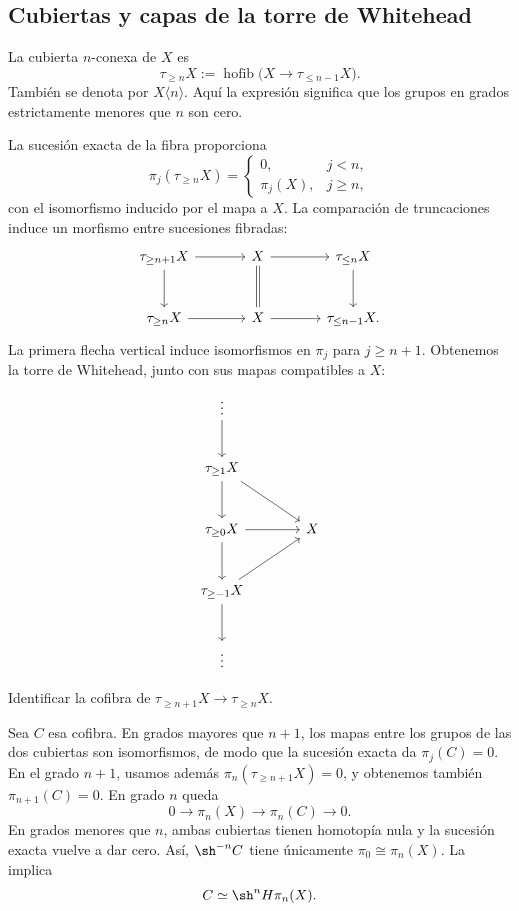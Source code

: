 \subsection{Cubiertas y capas de la torre de Whitehead}
\begin{defi}
La cubierta $n$-conexa de $X$ es
\[
\tau_{\geq n}X:=\operatorname{hofib}\bigl(X\longrightarrow\tau_{\leq n-1}X\bigr).
\]
También se denota por $X\langle n\rangle$. Aquí la expresión significa que los grupos en grados estrictamente menores que $n$ son cero.
\end{defi}
La sucesión exacta de la fibra proporciona
\[
\pi_j(\tau_{\geq n}X)=
\begin{cases}
0,&j<n,\\
\pi_j(X),&j\geq n,
\end{cases}
\]
con el isomorfismo inducido por el mapa a $X$. La comparación de truncaciones induce un morfismo entre sucesiones fibradas:
\[
\begin{tikzcd}[column sep=large,row sep=large]
\tau_{\geq n+1}X\arrow[r]\arrow[d]&X\arrow[r]\arrow[d,equal]&\tau_{\leq n}X\arrow[d]\\
\tau_{\geq n}X\arrow[r]&X\arrow[r]&\tau_{\leq n-1}X.
\end{tikzcd}
\]
La primera flecha vertical induce isomorfismos en $\pi_j$ para $j\geq n+1$. Obtenemos la torre de Whitehead, junto con sus mapas compatibles a $X$:
\[
\begin{tikzcd}[column sep=large,row sep=large]
\vdots\arrow[d]&\\
\tau_{\geq1}X\arrow[d]\arrow[dr]&\\
\tau_{\geq0}X\arrow[d]\arrow[r]&X\\
\tau_{\geq-1}X\arrow[d]\arrow[ur]&\\
\vdots&
\end{tikzcd}
\]

\begin{ejer}\label{ejer:c24-capa-whitehead}
Identificar la cofibra de $\tau_{\geq n+1}X\to\tau_{\geq n}X$.
\end{ejer}
\begin{sol}
Sea $C$ esa cofibra. En grados mayores que $n+1$, los mapas entre los grupos de las dos cubiertas son isomorfismos, de modo que la sucesión exacta da $\pi_j(C)=0$. En el grado $n+1$, usamos además $\pi_n(\tau_{\geq n+1}X)=0$, y obtenemos también $\pi_{n+1}(C)=0$. En grado $n$ queda
\[
0\longrightarrow\pi_n(X)\longrightarrow\pi_n(C)\longrightarrow0.
\]
En grados menores que $n$, ambas cubiertas tienen homotopía nula y la sucesión exacta vuelve a dar cero. Así, $\sh^{-n}C$ tiene únicamente $\pi_0\cong\pi_n(X)$. La  implica
\[
C\simeq\sh^nH\pi_n(X).
\]
\end{sol}

